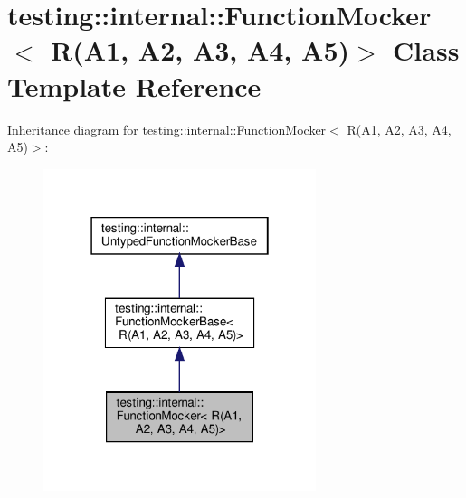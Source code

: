 \hypertarget{classtesting_1_1internal_1_1_function_mocker_3_01_r_07_a1_00_01_a2_00_01_a3_00_01_a4_00_01_a5_08_4}{}\section{testing\+:\+:internal\+:\+:Function\+Mocker$<$ R(A1, A2, A3, A4, A5)$>$ Class Template Reference}
\label{classtesting_1_1internal_1_1_function_mocker_3_01_r_07_a1_00_01_a2_00_01_a3_00_01_a4_00_01_a5_08_4}


Inheritance diagram for testing\+:\+:internal\+:\+:Function\+Mocker$<$ R(A1, A2, A3, A4, A5)$>$\+:
\nopagebreak
\begin{figure}[H]
\begin{center}
\leavevmode
\includegraphics[width=226pt]{classtesting_1_1internal_1_1_function_mocker_3_01_r_07_a1_00_01_a2_00_01_a3_00_01_a4_00_01_a5_08_4__inherit__graph}
\end{center}
\end{figure}


